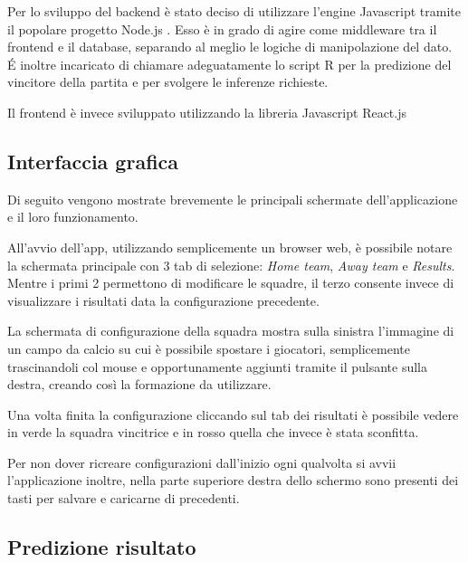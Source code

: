 \documentclass[hidelinks, 12pt]{article}
\begin{document}
Per lo sviluppo del backend è stato deciso di utilizzare l'engine Javascript tramite il popolare progetto Node.js \cite{site:nodejs}. Esso è in grado di agire come middleware tra il frontend e il database, separando al meglio le logiche di manipolazione del dato. \'E inoltre incaricato di chiamare adeguatamente lo script R per la predizione del vincitore della partita e per svolgere le inferenze richieste.

Il frontend è invece sviluppato utilizzando la libreria Javascript React.js \cite{site:react}



\subsection{Interfaccia grafica}

Di seguito vengono mostrate brevemente le principali schermate dell'applicazione e il loro funzionamento.

All'avvio dell'app, utilizzando semplicemente un browser web, è possibile notare la schermata principale con 3 tab di selezione: {\it Home team}, {\it Away team} e {\it Results}. Mentre i primi 2 permettono di modificare le squadre, il terzo consente invece di visualizzare i risultati data la configurazione precedente.


La schermata di configurazione della squadra mostra sulla sinistra l'immagine di un campo da calcio su cui è possibile spostare i giocatori, semplicemente trascinandoli col mouse e opportunamente aggiunti tramite il pulsante sulla destra, creando così la formazione da utilizzare.


Una volta finita la configurazione cliccando sul tab dei risultati è possibile vedere in verde la squadra vincitrice e in rosso quella che invece è stata sconfitta.


Per non dover ricreare configurazioni dall'inizio ogni qualvolta si avvii l'applicazione inoltre, nella parte superiore destra dello schermo sono presenti dei tasti per salvare e caricarne di precedenti.




\subsection{Predizione risultato}
\end{document}
